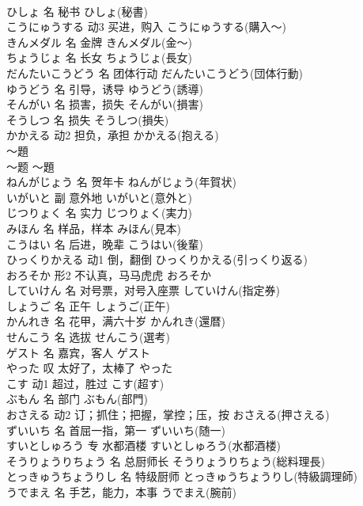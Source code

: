 \documentclass[8pt]{extreport}
\begin{document}
\begin{CJK}{UTF8}{min}
\\	ひしょ	名	秘书	ひしょ(秘書)	
\\	こうにゅうする	动3	买进，购入	こうにゅうする(購入～)	
\\	きんメダル	名	金牌	きんメダル(金～)	
\\	ちょうじょ	名	长女	ちょうじょ(長女)	
\\	だんたいこうどう	名	团体行动	だんたいこうどう(団体行動)	
\\	ゆうどう	名	引导，诱导	ゆうどう(誘導)	
\\	そんがい	名	损害，损失	そんがい(損害)	
\\	そうしつ	名	损失	そうしつ(損失)	
\\	かかえる	动2	担负，承担	かかえる(抱える)	
\\	～題	
\\	～题	～題	
\\	ねんがじょう	名	贺年卡	ねんがじょう(年賀状)	
\\	いがいと	副	意外地	いがいと(意外と)	
\\	じつりょく	名	实力	じつりょく(実力)	
\\	みほん	名	样品，样本	みほん(見本)	
\\	こうはい	名	后进，晚辈	こうはい(後輩)	
\\	ひっくりかえる	动1	倒，翻倒	ひっくりかえる(引っくり返る)	
\\	おろそか	形2	不认真，马马虎虎	おろそか	
\\	していけん	名	对号票，对号入座票	していけん(指定券)	
\\	しょうご	名	正午	しょうご(正午)	
\\	かんれき	名	花甲，满六十岁	かんれき(還暦)	
\\	せんこう	名	选拔	せんこう(選考)	
\\	ゲスト	名	嘉宾，客人	ゲスト	
\\	やった	叹	太好了，太棒了	やった	
\\	こす	动1	超过，胜过	こす(超す)	
\\	ぶもん	名	部门	ぶもん(部門)	
\\	おさえる	动2	订；抓住；把握，掌控；压，按	おさえる(押さえる)	
\\	ずいいち	名	首屈一指，第一	ずいいち(随一)	
\\	すいとしゅろう	专	水都酒楼	すいとしゅろう(水都酒楼)	
\\	そうりょうりちょう	名	总厨师长	そうりょうりちょう(総料理長)	
\\	とっきゅうちょうりし	名	特级厨师	とっきゅうちょうりし(特級調理師)	
\\	うでまえ	名	手艺，能力，本事	うでまえ(腕前)	

\end{CJK}
\end{document}
